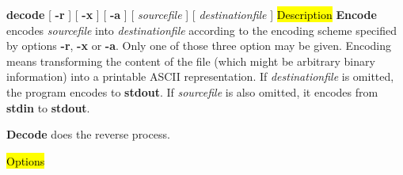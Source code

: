 {\bf decode} [ {\bf -r} ] [ {\bf -x} ] [ {\bf -a} ] [ {\em sourcefile} ] [ {\em destinationfile} ]
\hl{Description}
{\bf Encode} encodes {\em sourcefile} into {\em destinationfile} according to the encoding scheme
specified by options {\bf -r}, {\bf -x} or {\bf -a}. Only one of those three option may be given.
Encoding means transforming the content of the file (which might be arbitrary binary information)
into a printable ASCII representation.
If {\em destinationfile} is omitted, the program encodes to {\bf stdout}. 
If {\em sourcefile} is also omitted, it encodes from {\bf stdin} to {\bf stdout}.

{\bf Decode} does the reverse process.
 
\hl{Options}



